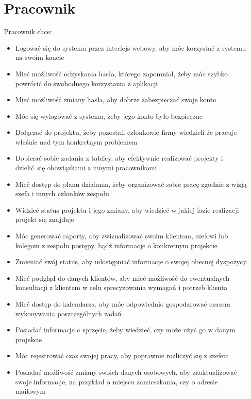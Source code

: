 \documentclass{article}
\begin{document}
\newpage
\section{Pracownik}
Pracownik chce:
\begin{itemize}
    \item Logować się do systemu przez interfejs webowy, aby móc korzystać z systemu na swoim koncie
    \item Mieć możliwość odzyskania hasła, którego zapomniał, żeby móc szybko powrócić do swobodnego korzystania z aplikacji
    \item Mieć możliwość zmiany hasła, aby dobrze zabezpieczać swoje konto
    \item Móc się wylogować z systemu, żeby jego konto było bezpieczne
    \item Dołączać do projektu, żeby pozostali członkowie firmy wiedzieli że pracuje właśnie nad tym konkretnym problemem
    \item Dobierać sobie zadania z tablicy, aby efektywnie realizować projekty i dzielić się obowiązkami z innymi pracownikami
    \item Mieć dostęp do planu działania, żeby organizować sobie pracę zgodnie z wizją szefa i innych członków zespołu
    \item Widzieć status projektu i jego zmiany, aby wiedzieć w jakiej fazie realizacji projekt się znajduje
    \item Móc generować raporty, aby zwizualizować swoim klientom, szefowi lub kolegom z zespołu postępy, bądź informacje o konkretnym projekcie
    \item Zmieniać swój status, aby udostępniać informacje o swojej obecnej dyspozycji
    \item Mieć podgląd do danych klientów, aby mieć możliwość do ewentualnych konsultacji z klientem w celu sprecyzowania wymagań i potrzeb klienta
    \item Mieć dostęp do kalendarza, aby móc odpowiednio gospodarować czasem wykonywania poszczególnych zadań
    \item Posiadać informacje o sprzęcie, żeby wiedzieć, czy może użyć go w danym projekcie
    \item Móc rejestrować czas swojej pracy, aby poprawnie rozliczyć się z szefem
    \item Posiadać możliwość zmiany swoich danych osobowych, aby zaaktualizować swoje informacje, na przykład o miejscu zamieszkania, czy o adresie mailowym
\end{itemize}
\end{document}
